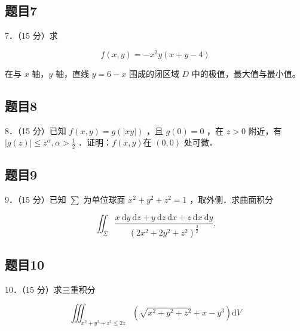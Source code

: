 \documentclass{article}
\begin{document}
\subsection{题目7}
7．（15 分）求

\[
f(x, y)=-x^{2} y(x+y-4)
\]

在与 \(x\) 轴，\(y\) 轴，直线 \(y=6-x\) 围成的闭区域 \(D\) 中的极值，最大值与最小值。

\subsection{题目8}
8．（15 分）已知 \(f(x, y)=g(|x y|)\) ，且 \(g(0)=0\) ，在 \(z>0\) 附近，有 \(|g(z)| \leq z^{\alpha}, \alpha>\frac{1}{2}\) ．证明：\(f(x, y)\)在 \((0,0)\) 处可微．

\subsection{题目9}
9．（15 分）已知 \(\sum\) 为单位球面 \(x^{2}+y^{2}+z^{2}=1\) ，取外侧．求曲面积分

\[
\iint_{\Sigma} \frac{x \mathrm{~d} y \mathrm{~d} z+y \mathrm{~d} z \mathrm{~d} x+z \mathrm{~d} x \mathrm{~d} y}{\left(2 x^{2}+2 y^{2}+z^{2}\right)^{\frac{3}{2}}} .
\]

\subsection{题目10}
10．（15 分）求三重积分

\[
\iiint_{x^{2}+y^{2}+z^{2} \leq 2 z}\left(\sqrt{x^{2}+y^{2}+z^{2}}+x-y^{3}\right) \mathrm{d} V
\]
\end{document}

